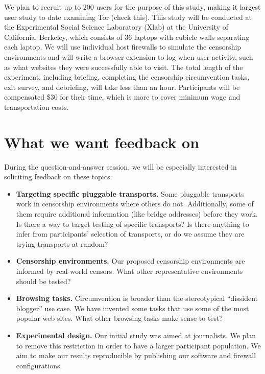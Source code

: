 \documentclass{sig-alternate-hotpets15}
\begin{document}

We plan to recruit up to 200 users for the purpose of this study, 
making it largest user study to date examining Tor (check this). 
This study will be conducted at the Experimental Social Science Laboratory (Xlab)
at the University of California, Berkeley, which consists of 36 laptops with 
cubicle walls separating each laptop. We will use individual host firewalls to simulate
the censorship environments and will write a browser extension to 
log when user activity, such as what websites they were successfully able to visit. 
The total length of the experiment, including briefing, completing the censorship 
circumvention tasks, exit survey, and debriefing, will take less than an hour. 
Participants will be compensated \$30 for their time, 
which is more to cover minimum wage and transportation costs.  \\

\section{What we want feedback on}

During the question-and-answer session,
we will be especially interested in soliciting feedback
on these topics:

\begin{itemize} \itemsep1pt \parskip0pt 
\item {\bfseries Targeting specific pluggable transports.}
Some pluggable transports work in censorship environments
where others do not.
Additionally, some of them require additional information
(like bridge addresses) before they work.
Is there a way to target testing of specific transports?
Is there anything to infer from participants' selection of transports, 
or do we assume they are trying transports at random?

\item {\bfseries Censorship environments.}
Our proposed censorship environments are informed
by real-world censors.
What other representative environments
should be tested?

\item {\bfseries Browsing tasks.}
Circumvention is broader than the stereotypical
``dissident blogger'' use case.
We have invented some tasks that use some of the
most popular web sites.
What other browsing tasks make sense to test?

\item {\bfseries Experimental design.}
Our initial study was aimed at journalists.
We plan to remove this restriction in order
to have a larger participant population.
We aim to make our results reproducible by publishing
our software and firewall configurations.
\end{itemize}
\end{document}
